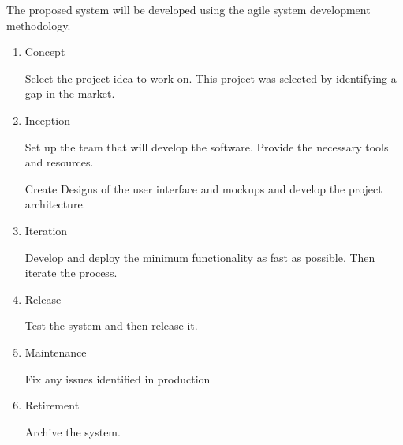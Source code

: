 
The proposed system will be developed using the agile system development methodology.

\begin{enumerate}
      \item Concept


            Select the project idea to work on. This project was selected by identifying a gap in the market.

      \item Inception


            Set up the team that will develop the software. Provide the necessary tools and resources.

            Create Designs of the user interface and mockups and develop the project architecture.

      \item Iteration


            Develop and deploy the minimum functionality as fast as possible. Then iterate the process.

      \item Release

            Test the system and then release it.

      \item Maintenance

            Fix any issues identified in production

      \item Retirement

            Archive the system.
\end{enumerate}
